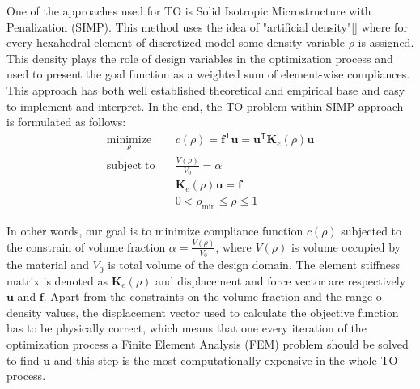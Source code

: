 One of the approaches used for TO is Solid Isotropic Microstructure with Penalization (SIMP).
This method uses the idea of "artificial density"\ref{} where for every hexahedral element of discretized model some density variable $\rho$ is assigned.
This density plays the role of design variables in the optimization process and used to present the goal function as a weighted sum of element-wise compliances.
This approach has both well established theoretical and empirical base and easy to implement and interpret.
In the end, the TO problem within SIMP approach is formulated as follows:
	\begin{align*}
		\underset{\rho}{\mathrm{minimize}} \quad & c(\rho) = \mathbf{f}^{\mathsf{T}} \mathbf{u} = \mathbf{u}^{\mathsf{T}} \mathbf{K}_{e}(\rho) \mathbf{u} \\
		\mathrm{subject \; to} \quad & \frac{V(\rho)}{V_{0}} = \alpha \\
		& \mathbf{K}_{e}(\rho) \mathbf{u} = \mathbf{f} \\
		& 0 < \rho_{\min} \leq \rho \leq 1
	\end{align*} 

In other words, our goal is to minimize compliance function $c(\rho)$ subjected to the constrain of volume fraction $\alpha = \frac{V(\rho)}{V_{0}}$, where $V(\rho)$ is volume occupied by the material and $ V_{0} $ is total volume of the design domain.
The element stiffness matrix is denoted as $\mathbf{K}_{e}(\rho)$ and displacement and force vector are respectively $\mathbf{u}$ and $\mathbf{f}$.
Apart from the constraints on the volume fraction and the range o density values, the displacement vector used to calculate the objective function has to be physically correct, which means that one every iteration of the optimization process a Finite Element Analysis (FEM) problem should be solved to find $\mathbf{u}$ and this step is the most computationally expensive in the whole TO process.


